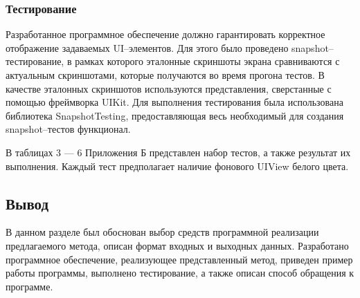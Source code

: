 \subsubsection{Тестирование}
Разработанное программное обеспечение должно гарантировать корректное отображение задаваемых UI--элементов.
Для этого было проведено snapshot--тестирование, в рамках которого эталонные скриншоты экрана сравниваются с актуальным скриншотами, которые получаются во время прогона тестов.
В качестве эталонных скриншотов используются представления, сверстанные с помощью фреймворка UIKit.
Для выполнения тестирования была использована библиотека SnapshotTesting, предоставляющая весь необходимый для создания snapshot--тестов функционал.

В таблицах 3 --- 6 Приложения Б представлен набор тестов, а также результат их выполнения.
Каждый тест предполагает наличие фонового UIView белого цвета.

\subsection*{Вывод}

В данном разделе был обоснован выбор средств программной реализации предлагаемого метода, описан формат входных и выходных данных. 
Разработано программное обеспечение, реализующее представленный метод, приведен пример работы программы, выполнено тестирование, а также описан способ обращения к программе.

\pagebreak